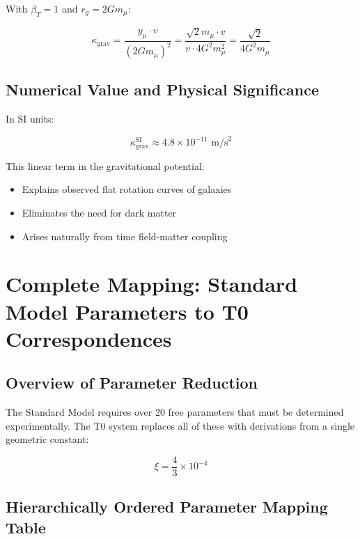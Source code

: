 \documentclass[12pt,a4paper]{report}
\begin{document}
	With $\beta_T = 1$ and $r_g = 2Gm_\mu$:
	
	\begin{equation}
		\kappa_{\text{grav}} = \frac{y_\mu \cdot v}{(2Gm_\mu)^2} = \frac{\sqrt{2} m_\mu \cdot v}{v \cdot 4G^2m_\mu^2} = \frac{\sqrt{2}}{4G^2m_\mu}
	\end{equation}
	
	\subsection{Numerical Value and Physical Significance}
	
	In SI units:
	
	\begin{equation}
		\kappa_{\text{grav}}^{\text{SI}} \approx 4.8 \times 10^{-11} \text{ m/s}^2
	\end{equation}
	
	This linear term in the gravitational potential:
	\begin{itemize}
		\item Explains observed flat rotation curves of galaxies
		\item Eliminates the need for dark matter
		\item Arises naturally from time field-matter coupling
	\end{itemize}
	
\section{Complete Mapping: Standard Model Parameters to T0 Correspondences}
\label{sec:sm_t0_mapping}

\subsection{Overview of Parameter Reduction}
\label{subsec:parameter_overview}

The Standard Model requires over 20 free parameters that must be determined experimentally. The T0 system replaces all of these with derivations from a single geometric constant:

\begin{equation}
	\boxed{\xi = \frac{4}{3} \times 10^{-4}}
\end{equation}

\subsection{Hierarchically Ordered Parameter Mapping Table}
\label{subsec:hierarchical_mapping}
\end{document}

